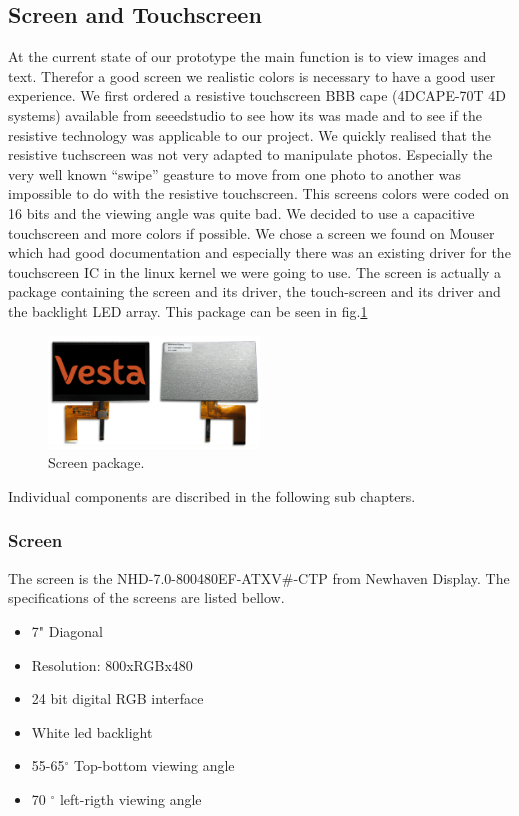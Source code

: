 \subsection{Screen and Touchscreen}
At the current state of our prototype the main function is to view images and text. Therefor a good screen we realistic colors is necessary to have a good user experience.
We first ordered a resistive touchscreen BBB cape (4DCAPE-70T 4D systems) available from seeedstudio to see how its was made and to see if the resistive technology was applicable to our project. We quickly realised that the resistive tuchscreen was not very adapted to manipulate photos. Especially the very well known “swipe” geasture to move from one photo to another was impossible to do with the resistive touchscreen.
This screens colors were coded on 16 bits and the viewing angle was quite bad. We decided to use a capacitive touchscreen and more colors if possible. We chose a screen we found on Mouser which had good documentation and especially there was an existing driver for the touchscreen IC in the linux kernel we were going to use.
 The screen is actually a package containing the screen and its driver, the touch-screen and its driver and the backlight LED array. This package can be seen in fig.\ref{fig:screen package}

 \begin{figure}[!htb]
     \centering
     \includegraphics[width=0.5\textwidth,keepaspectratio]{chap/hardFig/newhaven_screen_image}
     \caption{Screen package.}
     \label{fig:screen package}
 \end{figure}

 Individual components are discribed in the following sub chapters.

\subsubsection{Screen}
The screen is the NHD-7.0-800480EF-ATXV\#-CTP from Newhaven Display. The specifications of the screens are listed bellow.
\begin{itemize}
  \item {7" Diagonal}
  \item{Resolution: 800xRGBx480}
  \item{24 bit digital RGB interface}
  \item{White led backlight}
  \item{55-65$^{\circ}$ Top-bottom viewing angle }
  \item{70 $^{\circ}$ left-rigth viewing angle}
\end{itemize}


